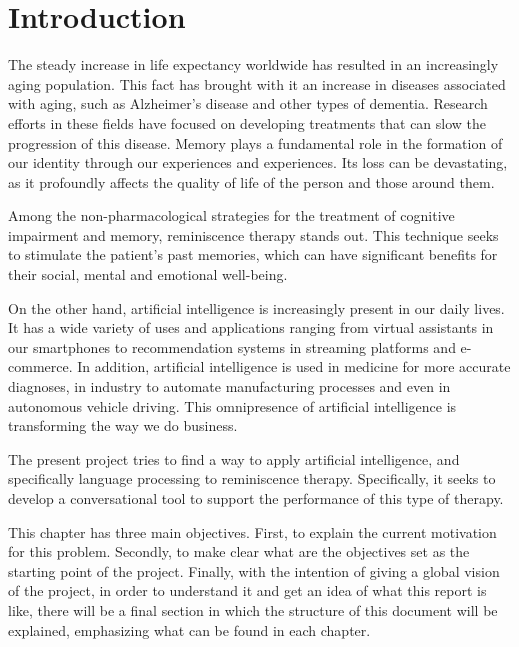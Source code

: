 \chapter*{Introduction} %
\label{chap:introduction}
The steady increase in life expectancy worldwide has resulted in an increasingly aging population. This fact has brought with it an increase in diseases associated with aging, such as Alzheimer's disease and other types of dementia. Research efforts in these fields have focused on developing treatments that can slow the progression of this disease. Memory plays a fundamental role in the formation of our identity through our experiences and experiences. Its loss can be devastating, as it profoundly affects the quality of life of the person and those around them.

Among the non-pharmacological strategies for the treatment of cognitive impairment and memory, reminiscence therapy stands out. This technique seeks to stimulate the patient's past memories, which can have significant benefits for their social, mental and emotional well-being.

On the other hand, artificial intelligence is increasingly present in our daily lives. It has a wide variety of uses and applications ranging from virtual assistants in our smartphones to recommendation systems in streaming platforms and e-commerce. In addition, artificial intelligence is used in medicine for more accurate diagnoses, in industry to automate manufacturing processes and even in autonomous vehicle driving. This omnipresence of artificial intelligence is transforming the way we do business.


The present project tries to find a way to apply artificial intelligence, and specifically language processing to reminiscence therapy. Specifically, it seeks to develop a conversational tool to support the performance of this type of therapy. 

This chapter has three main objectives. First, to explain the current motivation for this problem. Secondly, to make clear what are the objectives set as the starting point of the project. Finally, with the intention of giving a global vision of the project, in order to understand it and get an idea of what this report is like, there will be a final section in which the structure of this document will be explained, emphasizing what can be found in each chapter. 
